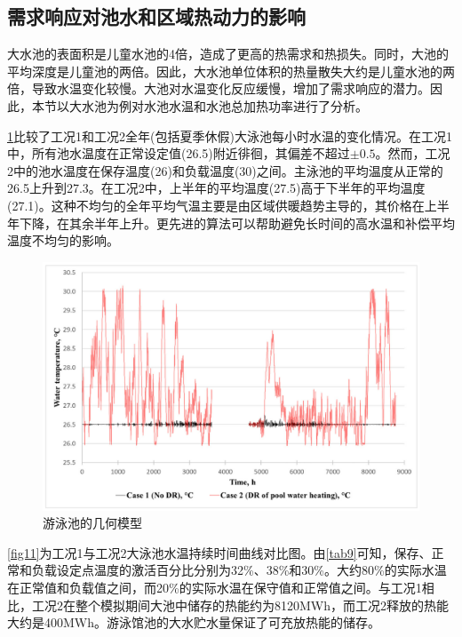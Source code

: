 \documentclass[hyperref]{ctexart}
\begin{document}
\begin{multicols}{2}
		\subsection{需求响应对池水和区域热动力的影响}
		大水池的表面积是儿童水池的4倍，造成了更高的热需求和热损失。同时，大池的平均深度是儿童池的两倍。因此，大水池单位体积的热量散失大约是儿童水池的两倍，导致水温变化较慢。大池对水温变化反应缓慢，增加了需求响应的潜力。因此，本节以大水池为例对水池水温和水池总加热功率进行了分析。
		\par
		\cref{fig10}比较了工况1和工况2全年(包括夏季休假)大泳池每小时水温的变化情况。在工况1中，所有池水温度在正常设定值(26.5\textcelsius)附近徘徊，其偏差不超过$\pm0.5$\textcelsius。然而，工况2中的池水温度在保存温度(26\textcelsius)和负载温度(30\textcelsius)之间。主泳池的平均温度从正常的26.5\textcelsius 上升到27.3\textcelsius。在工况2中，上半年的平均温度(27.5\textcelsius)高于下半年的平均温度(27.1\textcelsius)。这种不均匀的全年平均气温主要是由区域供暖趋势主导的，其价格在上半年下降，在其余半年上升。更先进的算法可以帮助避免长时间的高水温和补偿平均温度不均匀的影响。
		\par
		\begin{figure}[htbp]
			\centering
			\includegraphics[scale=0.4]{figure_translate/10.png}
			\caption{游泳池的几何模型}
			\label{fig10}
		\end{figure}
		\cref{fig11}为工况1与工况2大泳池水温持续时间曲线对比图。由\cref{tab9}可知，保存、正常和负载设定点温度的激活百分比分别为32\%、38\%和30\%。大约80\%的实际水温在正常值和负载值之间，而20\%的实际水温在保守值和正常值之间。与工况1相比，工况2在整个模拟期间大池中储存的热能约为8120MWh，而工况2释放的热能大约是400MWh。游泳馆池的大水贮水量保证了可充放热能的储存。
		\par

\end{multicols}
\end{document}
